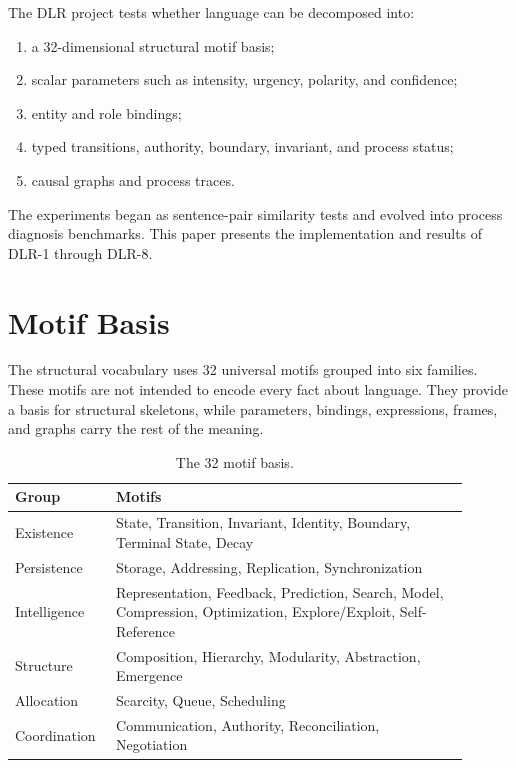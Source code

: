 \documentclass[11pt]{article}
\begin{document}
The DLR project tests whether language can be decomposed into:

\begin{enumerate}
  \item a 32-dimensional structural motif basis;
  \item scalar parameters such as intensity, urgency, polarity, and confidence;
  \item entity and role bindings;
  \item typed transitions, authority, boundary, invariant, and process status;
  \item causal graphs and process traces.
\end{enumerate}

The experiments began as sentence-pair similarity tests and evolved into
process diagnosis benchmarks. This paper presents the implementation and
results of DLR-1 through DLR-8.

\section{Motif Basis}

The structural vocabulary uses 32 universal motifs grouped into six families.
These motifs are not intended to encode every fact about language. They provide
a basis for structural skeletons, while parameters, bindings, expressions,
frames, and graphs carry the rest of the meaning.

\begin{table}[h]
\centering
\caption{The 32 motif basis.}
\small
\begin{tabular}{p{0.18\linewidth}p{0.72\linewidth}}
\toprule
Group & Motifs \\
\midrule
Existence & State, Transition, Invariant, Identity, Boundary, Terminal State, Decay \\
Persistence & Storage, Addressing, Replication, Synchronization \\
Intelligence & Representation, Feedback, Prediction, Search, Model, Compression, Optimization, Explore/Exploit, Self-Reference \\
Structure & Composition, Hierarchy, Modularity, Abstraction, Emergence \\
Allocation & Scarcity, Queue, Scheduling \\
Coordination & Communication, Authority, Reconciliation, Negotiation \\
\bottomrule
\end{tabular}
\end{table}
\end{document}
